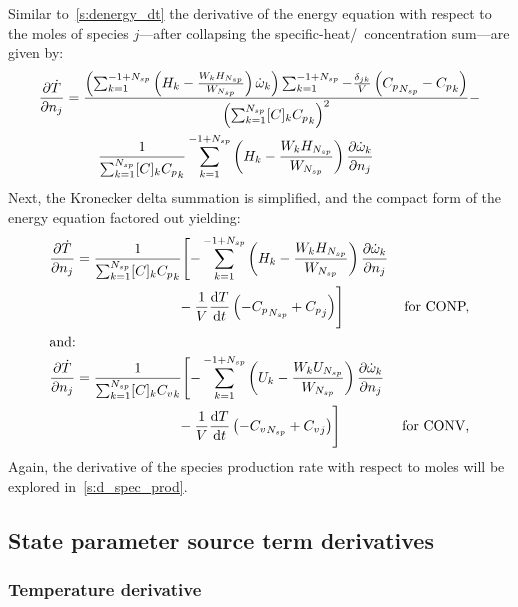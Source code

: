 \documentclass[12pt,number,sort&compress]{elsarticle}
\newcommand{\ns}{N_{sp}}
\newcommand{\conp}{CONP}
\newcommand{\conv}{CONV}
\newcommand{\dconp}{\ifmmode\text{for \conp,}\else for \conp,\fi}
\newcommand{\dconv}{\ifmmode\text{for \conv,}\else for \conv,\fi}
\begin{document}
Similar to~\cref{s:denergy_dt} the derivative of the energy equation with respect to the moles of species $j$---after collapsing the specific-heat\slash~concentration sum---are given by:
\begin{align}
 \frac{\partial\dot{T}}{\partial{n_j}} &= \frac{\left(\sum_{k=1}^{-1 + \ns} \left(H_{k} - \frac{W_{k} H_{\ns}}{W_{\ns}}\right) \dot{\omega}_{k}\right) \sum_{k=1}^{-1 + \ns} - \frac{\delta_{j k}}{V} \left({C_p}_{\ns} - {C_p}_{k}\right)}{\left(\sum_{k=1}^{\ns} [C]_{k} {C_p}_{k}\right)^{2}} - \nonumber \\
				       & \mathindent \frac{1}{\sum_{k=1}^{\ns} [C]_{k} {C_p}_{k}} \sum_{k=1}^{-1 + \ns} \left(H_{k} - \frac{W_{k} H_{\ns}}{W_{\ns}}\right) \frac{\partial \dot{\omega}_{k} }{\partial {n_j} }
\end{align}
Next, the Kronecker delta summation is simplified, and the compact form of the energy equation factored out yielding:
\begin{subequations}
\begin{align}
 \frac{\partial\dot{T}}{\partial{n_j}} &= \frac{1}{\sum_{k=1}^{\ns} [C]_{k} {C_p}_{k}} \Biggl[- \sum_{k=1}^{-1 + \ns} \left(H_{k} - \frac{W_{k} H_{\ns}}{W_{\ns}}\right) \frac{\partial \dot{\omega}_{k} }{\partial {n_j} } & \nonumber \\
				       &  \mathindent[largerindentand] - \frac{1}{V} \frac{\text{d} T }{\text{d} t } \left(- {C_p}_{\ns} + {C_p}_{j}\right)\Biggr] & \text{\dconp} \\
\intertext{and:}
 \frac{\partial\dot{T}}{\partial{n_j}} &= \frac{1}{\sum_{k=1}^{\ns} [C]_{k} {C_v}_{k}} \Biggl[- \sum_{k=1}^{-1 + \ns} \left(U_{k} - \frac{W_{k} U_{\ns}}{W_{\ns}}\right) \frac{\partial \dot{\omega}_{k} }{\partial {n_j} } & \nonumber \\
				       & \mathindent[largerindentand] - \frac{1}{V} \frac{\text{d} T }{\text{d} t } \left(- {C_v}_{\ns} + {C_v}_{j}\right) \Biggr] & \text{\dconv}
\end{align}
\end{subequations}
Again, the derivative of the species production rate with respect to moles will be explored in~\cref{s:d_spec_prod}.

\subsection{State parameter source term derivatives}
\label{s:parameter_source_derivatives}
\subsubsection{Temperature derivative}
\end{document}
